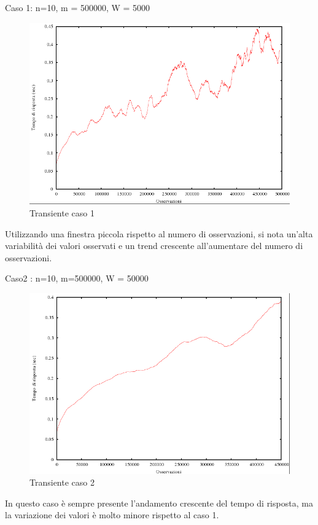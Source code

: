 Caso 1: n=10, m = 500000, W = 5000
\begin{figure}[H]
\begin{center}
\includegraphics[scale=0.5]{etc/grafico1.png}
\caption{Transiente caso 1}
\label{Grafico1}
\end{center}
\end{figure}
Utilizzando una finestra piccola rispetto al numero di osservazioni, si nota un'alta variabilità dei valori osservati e un trend  crescente all'aumentare del numero di osservazioni.

Caso2 : n=10, m=500000, W = 50000
\begin{figure}[H]
\begin{center}
\includegraphics[scale=0.5]{etc/grafico2.png}
\caption{Transiente caso 2}
\label{Grafico2}
\end{center}
\end{figure}
In questo caso è sempre presente l'andamento crescente del tempo di risposta, ma la variazione dei valori è molto minore rispetto al caso 1.

